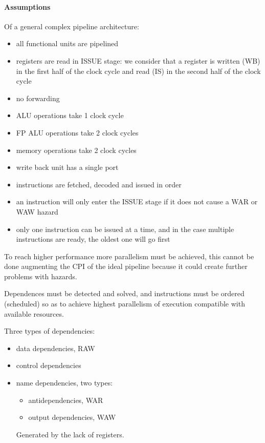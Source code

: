 \paragraph{Assumptions} Of a general complex pipeline architecture:
\begin{itemize}
    \item all functional units are pipelined
    \item registers are read in ISSUE stage: we consider that a register is written (WB) in the first half of the clock
    cycle and read (IS) in the second half of the clock cycle
    \item no forwarding
    \item ALU operations take 1 clock cycle
    \item FP ALU operations take 2 clock cycles
    \item memory operations take 2 clock cycles
    \item write back unit has a single port
    \item instructions are fetched, decoded and issued in order
    \item an instruction will only enter the ISSUE stage if it does not cause a WAR or WAW hazard
    \item only one instruction can be issued at a time, and in the case multiple instructions are ready, the oldest
    one will go first
\end{itemize}


To reach higher performance more parallelism must be achieved, this cannot be done augmenting the CPI of the ideal
pipeline because it could create further problems with hazards.

Dependences must be detected and solved, and
instructions must be ordered (scheduled) so as to
achieve highest parallelism of execution compatible
with available resources.

Three types of dependencies:
\begin{itemize}
    \item data dependencies, RAW
    \item control dependencies
    \item name dependencies, two types:
    \begin{itemize}
        \item antidependencies, WAR
        \item output dependencies, WAW
    \end{itemize}
    Generated by the lack of registers.
\end{itemize}

